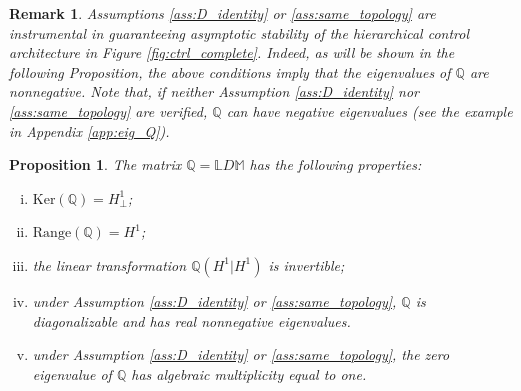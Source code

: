 \documentclass[a4paper]{article}
\theoremstyle{plain}
\newtheorem{rmk}{Remark}
\newtheorem{prp}{Proposition}
\begin{document}
	\begin{rmk}
		Assumptions \ref{ass:D_identity} or \ref{ass:same_topology} are instrumental in guaranteeing asymptotic stability of the hierarchical control architecture in Figure \ref{fig:ctrl_complete}. Indeed, as will be shown in the following Proposition, the above conditions imply that the eigenvalues of $\mathbb{Q}$ are nonnegative.
		Note that, if neither Assumption \ref{ass:D_identity} nor \ref{ass:same_topology} are verified, $\mathbb{Q}$ can have negative eigenvalues (see the example in Appendix \ref{app:eig_Q}).
	\end{rmk}

\begin{prp}
	\label{prop_2}
	The matrix $\mathbb{Q} = \mathbb{L}D\mathbb{M}$ has the following properties:
	\begin{enumerate}[(i)]
		\item \label{prop:zero_row_sum} $\mathrm{Ker}(\mathbb{Q})=H^1_{\perp}$;
		\item \label{prop:range} $\mathrm{Range}(\mathbb{Q}) = H^1$;
		\item \label{prop:Q_invertible} the linear transformation $\mathbb{Q}(H^1|H^1)$ is invertible;
		\item \label{prop:diag_and_psd} under Assumption \ref{ass:D_identity} or \ref{ass:same_topology}, $\mathbb{Q}$ is diagonalizable and has real nonnegative eigenvalues.
		\item \label{prop:zero_eig} under Assumption \ref{ass:D_identity} or \ref{ass:same_topology}, the zero eigenvalue of $\mathbb{Q}$ has algebraic multiplicity equal to one.
	\end{enumerate}
\end{prp}
\end{document}

